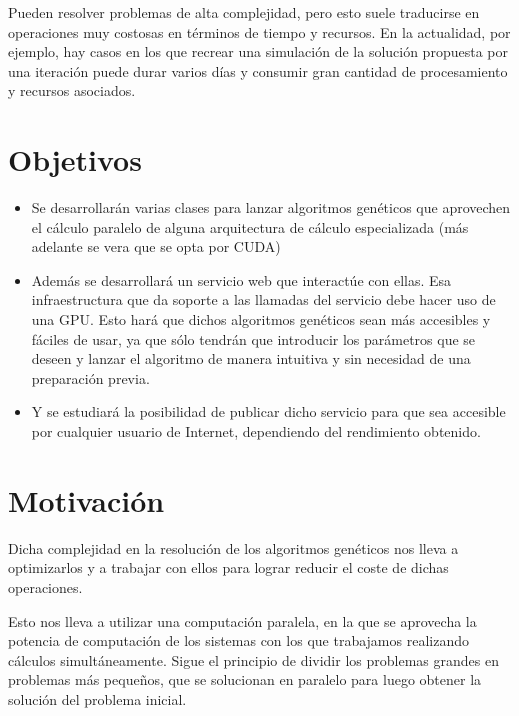 \bigskip
Pueden resolver problemas de alta complejidad, pero esto suele traducirse en operaciones muy costosas en términos de tiempo y recursos. En la actualidad, por ejemplo, hay casos en los que recrear una simulación de la solución propuesta por una iteración puede durar varios días y consumir gran cantidad de procesamiento y recursos asociados.





\bigskip
\section{Objetivos}
\bigskip


\begin{itemize}
	
	\item Se desarrollarán varias clases para lanzar algoritmos genéticos que aprovechen el cálculo paralelo de alguna arquitectura de cálculo especializada (más adelante se vera que se opta por CUDA)
	
	\item Además se desarrollará un servicio web que interactúe con ellas. Esa infraestructura que da soporte a las llamadas del servicio debe hacer uso de una GPU. Esto hará que dichos algoritmos genéticos sean más accesibles y fáciles de usar, ya que sólo tendrán que introducir los parámetros que se deseen y lanzar el algoritmo de manera intuitiva y sin necesidad de una preparación previa.
	
	\item Y se estudiará la posibilidad de publicar dicho servicio para que sea accesible por cualquier usuario de Internet, dependiendo del rendimiento obtenido.
	
\end{itemize}



\bigskip
\section{Motivación}
\bigskip

Dicha complejidad en la resolución de los algoritmos genéticos nos lleva a optimizarlos y a trabajar con ellos para lograr reducir el coste de dichas operaciones. 

Esto nos lleva a utilizar una computación paralela, en la que se aprovecha la potencia de computación de los sistemas con los que trabajamos realizando cálculos simultáneamente. Sigue el principio de dividir los problemas grandes en problemas más pequeños, que se solucionan en paralelo para luego obtener la solución del problema inicial.

